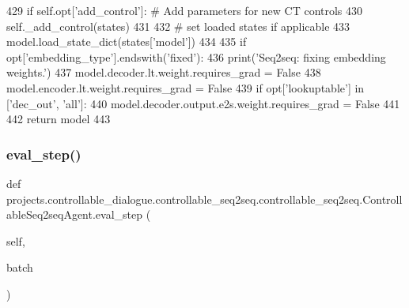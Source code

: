 \begin{DoxyCode}
429             \textcolor{keywordflow}{if} self.opt[\textcolor{stringliteral}{'add\_control'}]:  \textcolor{comment}{# Add parameters for new CT controls}
430                 self.\_add\_control(states)
431 
432             \textcolor{comment}{# set loaded states if applicable}
433             model.load\_state\_dict(states[\textcolor{stringliteral}{'model'}])
434 
435         \textcolor{keywordflow}{if} opt[\textcolor{stringliteral}{'embedding\_type'}].endswith(\textcolor{stringliteral}{'fixed'}):
436             print(\textcolor{stringliteral}{'Seq2seq: fixing embedding weights.'})
437             model.decoder.lt.weight.requires\_grad = \textcolor{keyword}{False}
438             model.encoder.lt.weight.requires\_grad = \textcolor{keyword}{False}
439             \textcolor{keywordflow}{if} opt[\textcolor{stringliteral}{'lookuptable'}] \textcolor{keywordflow}{in} [\textcolor{stringliteral}{'dec\_out'}, \textcolor{stringliteral}{'all'}]:
440                 model.decoder.output.e2s.weight.requires\_grad = \textcolor{keyword}{False}
441 
442         \textcolor{keywordflow}{return} model
443 
\end{DoxyCode}
\mbox{\label{classprojects_1_1controllable__dialogue_1_1controllable__seq2seq_1_1controllable__seq2seq_1_1ControllableSeq2seqAgent_a531943b5d1caee714bba77decbc93161}} 
\subsubsection{\texorpdfstring{eval\+\_\+step()}{eval\_step()}}
{\footnotesize\ttfamily def projects.\+controllable\+\_\+dialogue.\+controllable\+\_\+seq2seq.\+controllable\+\_\+seq2seq.\+Controllable\+Seq2seq\+Agent.\+eval\+\_\+step (\begin{DoxyParamCaption}\item[{}]{self,  }\item[{}]{batch }\end{DoxyParamCaption})}

